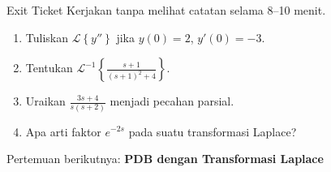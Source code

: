 \documentclass[aspectratio=169,10pt]{beamer}
\newcommand{\Lcal}{\mathcal{L}}
\newcommand{\Lap}[1]{\Lcal\left\{#1\right\}}
\newcommand{\invLap}[1]{\Lcal^{-1}\left\{#1\right\}}
\begin{document}
\begin{frame}{Exit Ticket}
Kerjakan tanpa melihat catatan selama 8--10 menit.
\begin{enumerate}
\item Tuliskan $\Lap{y''}$ jika $y(0)=2$, $y'(0)=-3$.
\item Tentukan $\displaystyle \invLap{\frac{s+1}{(s+1)^2+4}}$.
\item Uraikan $\displaystyle \frac{3s+4}{s(s+2)}$ menjadi pecahan parsial.
\item Apa arti faktor $e^{-2s}$ pada suatu transformasi Laplace?
\end{enumerate}
\vspace{2mm}
\centering\large Pertemuan berikutnya: \textbf{PDB dengan Transformasi Laplace}
\end{frame}
\end{document}

